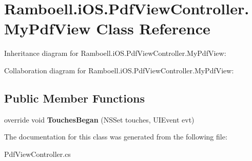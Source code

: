 \hypertarget{class_ramboell_1_1i_o_s_1_1_pdf_view_controller_1_1_my_pdf_view}{}\section{Ramboell.\+i\+O\+S.\+Pdf\+View\+Controller.\+My\+Pdf\+View Class Reference}
\label{class_ramboell_1_1i_o_s_1_1_pdf_view_controller_1_1_my_pdf_view}


Inheritance diagram for Ramboell.\+i\+O\+S.\+Pdf\+View\+Controller.\+My\+Pdf\+View\+:


Collaboration diagram for Ramboell.\+i\+O\+S.\+Pdf\+View\+Controller.\+My\+Pdf\+View\+:
\subsection*{Public Member Functions}
\begin{DoxyCompactItemize}
\item 
\mbox{\label{class_ramboell_1_1i_o_s_1_1_pdf_view_controller_1_1_my_pdf_view_acca020cad65fb98eebc091a49e4c6593}} 
override void {\bfseries Touches\+Began} (N\+S\+Set touches, U\+I\+Event evt)
\end{DoxyCompactItemize}


The documentation for this class was generated from the following file\+:\begin{DoxyCompactItemize}
\item 
Pdf\+View\+Controller.\+cs\end{DoxyCompactItemize}
